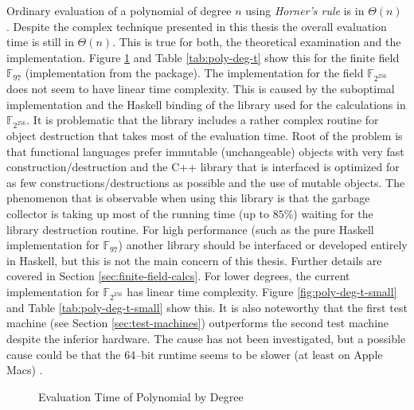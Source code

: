 %
%
\label{sec:comp-complexity}

Ordinary evaluation of a polynomial of degree $n$ using \emph{Horner's rule} is
in $\Theta(n)$ \cite{cormen01}. Despite the complex technique presented in this
thesis the overall evaluation time is still in $\Theta(n)$. This is true for
both, the theoretical examination and the implementation. Figure
\ref{fig:poly-deg-t} and Table \ref{tab:poly-deg-t} show this for the finite
field $\mathbb{F}_{97}$ (implementation from the \JWTLhaskellForMaths{}
package). The implementation for the field $\mathbb{F}_{2^{256}}$ does not seem
to have linear time complexity. This is caused by the suboptimal implementation
and the Haskell binding of the library used for the calculations in
$\mathbb{F}_{2^{256}}$. It is problematic that the library includes a rather
complex routine for object destruction that takes most of the evaluation time.
Root of the problem is that functional languages prefer immutable (unchangeable)
objects with very fast construction/destruction and the C++ library that is
interfaced is optimized for as few constructions/destructions as possible and
the use of mutable objects. The phenomenon that is observable when using this
library is that the garbage collector is taking up most of the running time (up
to $85\%$) waiting for the library destruction routine. For high performance
(such as the pure Haskell implementation for $\mathbb{F}_{97}$) another library
should be interfaced or developed entirely in Haskell, but this is not the main
concern of this thesis. Further details are covered in Section
\ref{sec:finite-field-calcs}. For lower degrees, the current implementation for
$\mathbb{F}_{2^{256}}$ has linear time complexity. Figure
\ref{fig:poly-deg-t-small} and Table \ref{tab:poly-deg-t-small} show this. It is
also noteworthy that the first test machine (see Section
\ref{sec:test-machines}) outperforms the second test machine despite the
inferior hardware. The cause has not been investigated, but a possible cause
could be that the 64--bit \JWTghc{} runtime seems to be slower (at least on
Apple Macs) \cite{lentczner11}.


\begin{figure}[ht]
  \centering
  
  \caption{Evaluation Time of Polynomial by Degree}
  \label{fig:poly-deg-t}
\end{figure}


